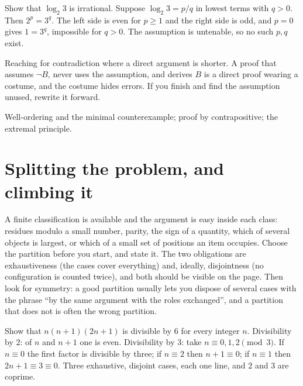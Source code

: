 \begin{worked}
Show that $\log_{2}3$ is irrational. Suppose $\log_{2}3=p/q$ in lowest terms with $q>0$. Then $2^{p}=3^{q}$. The left side is even for $p\geq1$ and the right side is odd, and $p=0$ gives $1=3^{q}$, impossible for $q>0$. The assumption is untenable, so no such $p,q$ exist.
\end{worked}

\begin{trap}
Reaching for contradiction where a direct argument is shorter. A proof that assumes $\lnot B$, never uses the assumption, and derives $B$ is a direct proof wearing a costume, and the costume hides errors. If you finish and find the assumption unused, rewrite it forward.
\end{trap}

\begin{seealsob}Well-ordering and the minimal counterexample; proof by contrapositive; the extremal principle.\end{seealsob}

\section{Splitting the problem, and climbing it}

\cue A finite classification is available and the argument is easy inside each class: residues modulo a small number, parity, the sign of a quantity, which of several objects is largest, or which of a small set of positions an item occupies.
\method Choose the partition before you start, and state it. The two obligations are exhaustiveness (the cases cover everything) and, ideally, disjointness (no configuration is counted twice), and both should be visible on the page. Then look for symmetry: a good partition usually lets you dispose of several cases with the phrase ``by the same argument with the roles exchanged'', and a partition that does not is often the wrong partition.

\begin{worked}
Show that $n(n+1)(2n+1)$ is divisible by $6$ for every integer $n$. Divisibility by $2$: of $n$ and $n+1$ one is even. Divisibility by $3$: take $n\equiv0,1,2\pmod 3$. If $n\equiv0$ the first factor is divisible by three; if $n\equiv2$ then $n+1\equiv0$; if $n\equiv1$ then $2n+1\equiv3\equiv0$. Three exhaustive, disjoint cases, each one line, and $2$ and $3$ are coprime.
\end{worked}

